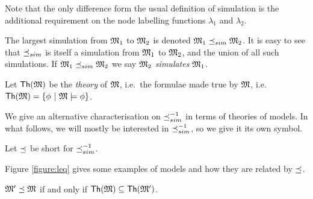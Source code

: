\NI Note that the only difference form the usual definition of
simulation is the additional requirement on the node labelling
functions $\lambda_1$ and $\lambda_2$.

\begin{definition}
The largest simulation from $\frak{M}_1$ to $\frak{M}_2$ is denoted $\frak{M}_1
\preceq_{sim} \frak{M}_2$.  It is easy to see that $\preceq_{sim}$ is itself a
simulation from $\frak{M}_1$ to $\frak{M}_2$, and the union of all such
simulations.  If $\frak{M}_1 \preceq_{sim} \frak{M}_2$ we say $\frak{M}_2$
\emph{simulates} $\frak{M}_1$.
\end{definition}

\begin{definition}
Let $\mathsf{Th}(\frak{M})$ be the \emph{theory} of $\frak{M}$, i.e.~the formulae
made true by $\frak{M}$, i.e.~$\mathsf{Th}(\frak{M}) = \{\phi\ |\ \frak{M} \models
\phi \}$.
\end{definition}

\NI We give an alternative characterisation on $\preceq_{sim}^{-1}$ in terms of
theories of models. In what follows, we will mostly be interested in
$\preceq_{sim}^{-1}$, so we give it its own symbol.

\begin{definition}
Let $\preceq$  be short for $\preceq_{sim}^{-1}$.
\end{definition}

\NI Figure \ref{figure:leq} gives some examples of models and how they
are related by $\preceq$.



\begin{theorem}\label{theorem:completeLattice}
$\frak{M}' \preceq \frak{M}$ if and only if
$\mathsf{Th}(\frak{M}) \subseteq  \mathsf{Th}(\frak{M}')$.
\end{theorem}

